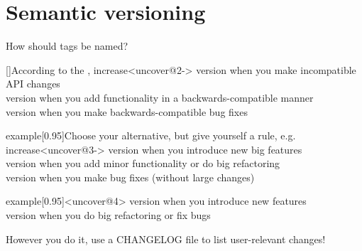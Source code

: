 \documentclass[usenames,svgnames,14pt]{beamer}
\begin{document}
\section{Semantic versioning}
\begin{frame}{How should tags be named? \hfill{}}
    \vspace{-2mm}
    \PrepareURLsymbol[PB]
    \begin{varblock*}{}[\textwidth]{According to the \color{PP}, increase}<uncover@2->
        \small
         version  when you make incompatible API changes\\
         version  when you add functionality in a backwards-compatible manner\\
         version  when you make backwards-compatible bug fixes
    \end{varblock*}
    \begin{varblock*}{example}[0.95\textwidth]{Choose your alternative, but give yourself a rule, e.g. increase}<uncover@3->
        \small
         version  when you introduce new big features\\
         version  when you add minor functionality or do big refactoring\\
         version  when you make bug fixes (without large changes)
    \end{varblock*}
    \vspace{-2mm}
    \begin{varblock*}{example}[0.95\textwidth]{}<uncover@4>
        \small
         version  when you introduce new features\\
         version  when you do big refactoring or fix bugs
    \end{varblock*}
    \begin{center}
        \alert{However you do it, use a CHANGELOG file to list user-relevant changes!}
    \end{center}
\end{frame}
\end{document}
